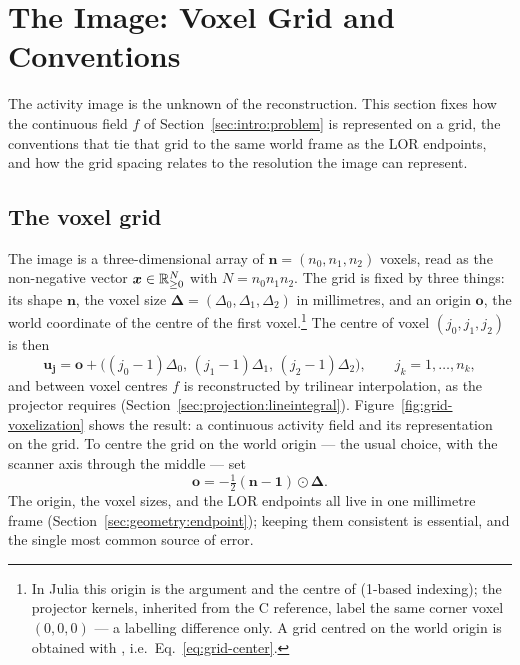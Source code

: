 \section{The Image: Voxel Grid and Conventions}
\label{sec:grid}

The activity image is the unknown of the reconstruction. This section fixes how
the continuous field $f$ of Section~\ref{sec:intro:problem} is represented on a
grid, the conventions that tie that grid to the same world frame as the LOR
endpoints, and how the grid spacing relates to the resolution the image can
represent.

\subsection{The voxel grid}
\label{sec:grid:grid}

The image is a three-dimensional array of $\bm{n}=(n_0,n_1,n_2)$ voxels, read as
the non-negative vector $\bm{x}\in\mathbb{R}^N_{\ge0}$ with $N=n_0 n_1 n_2$. The grid is
fixed by three things: its shape $\bm{n}$, the voxel size
$\bm{\Delta}=(\Delta_0,\Delta_1,\Delta_2)$ in millimetres, and an origin
$\bm{o}$, the world coordinate of the centre of the first
voxel.\footnote{In Julia this origin is the  argument and the
centre of  (1-based indexing); the projector kernels, inherited
from the C reference, label the same corner voxel $(0,0,0)$ --- a labelling
difference only. A grid centred on the world origin is obtained with
, i.e.\ Eq.~\eqref{eq:grid-center}.}
The centre of voxel $(j_0,j_1,j_2)$ is then
\begin{equation}
  \bm{u}_{\bm j} = \bm{o}
    + \bigl((j_0-1)\Delta_0,\,(j_1-1)\Delta_1,\,(j_2-1)\Delta_2\bigr),
  \qquad j_k = 1,\dots,n_k ,
  \label{eq:grid-map}
\end{equation}
and between voxel centres $f$ is reconstructed by trilinear interpolation, as the
projector requires (Section~\ref{sec:projection:lineintegral}).
Figure~\ref{fig:grid-voxelization} shows the result: a continuous activity field
and its representation on the grid. To centre the grid on the world origin ---
the usual choice, with the scanner axis through the middle --- set
\begin{equation}
  \bm{o} = -\tfrac12(\bm{n}-\bm{1})\odot\bm{\Delta} .
  \label{eq:grid-center}
\end{equation}
The origin, the voxel sizes, and the LOR endpoints all live in one millimetre
frame (Section~\ref{sec:geometry:endpoint}); keeping them consistent is
essential, and the single most common source of error.

